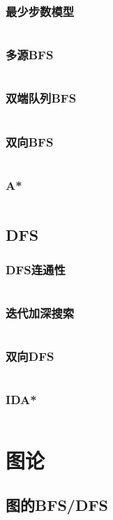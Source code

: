 \documentclass[a4paper,12pt]{article}
\begin{document}
\subsubsection{最少步数模型}
\inputminted[breaklines]{c++}{search/bfs/min_step.cc}
\subsubsection{多源BFS}
\inputminted[breaklines]{c++}{search/bfs/mul_source.cc}
\subsubsection{双端队列BFS}
\inputminted[breaklines]{c++}{search/bfs/deq_bfs.cc}
\subsubsection{双向BFS}
\inputminted[breaklines]{c++}{search/bfs/2side_bfs.cc}
\subsubsection{A*}
\inputminted[breaklines]{c++}{search/bfs/astar.cc}
\subsection{DFS}
\subsubsection{DFS连通性}
\inputminted[breaklines]{c++}{search/dfs/link.cc}
\subsubsection{迭代加深搜索}
\inputminted[breaklines]{c++}{search/dfs/diedai.cc}
\subsubsection{双向DFS}
\inputminted[breaklines]{c++}{search/dfs/2side.cc}
\subsubsection{IDA*}
\inputminted[breaklines]{c++}{search/dfs/ida.cc}


\newpage
\section{图论} %
\subsection{图的BFS/DFS}  %
\end{document}
